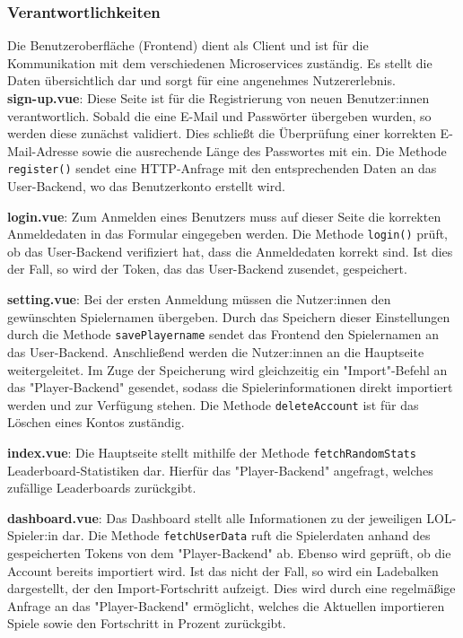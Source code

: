 \subsubsection{Verantwortlichkeiten}

Die Benutzeroberfläche (Frontend) dient als Client und ist für die Kommunikation mit dem verschiedenen Microservices zuständig. Es stellt die Daten übersichtlich dar und sorgt für eine
angenehmes Nutzererlebnis. \\

\textbf{sign-up.vue}: Diese Seite ist für die Registrierung von neuen Benutzer:innen verantwortlich. Sobald die eine E-Mail und Passwörter übergeben wurden, so werden diese zunächst
validiert. Dies schließt die Überprüfung einer korrekten E-Mail-Adresse sowie die ausrechende Länge des Passwortes mit ein. Die Methode \verb|register()| sendet eine HTTP-Anfrage mit den 
entsprechenden Daten an das User-Backend, wo das Benutzerkonto erstellt wird.
\newline

\textbf{login.vue}: Zum Anmelden eines Benutzers muss auf dieser Seite die korrekten Anmeldedaten in das Formular eingegeben werden. Die Methode \verb|login()| prüft, ob das User-Backend
verifiziert hat, dass die Anmeldedaten korrekt sind. Ist dies der Fall, so wird der Token, das das User-Backend zusendet, gespeichert. 
\newline

\textbf{setting.vue}: Bei der ersten Anmeldung müssen die Nutzer:innen den gewünschten Spielernamen übergeben. Durch das Speichern dieser Einstellungen durch die Methode \verb|savePlayername|
sendet das Frontend den Spielernamen an das User-Backend. Anschließend werden die Nutzer:innen an die Hauptseite weitergeleitet. Im Zuge der Speicherung wird gleichzeitig ein "Import"-Befehl
an das "Player-Backend" gesendet, sodass die Spielerinformationen direkt importiert werden und zur Verfügung stehen. Die Methode \verb|deleteAccount| ist für das Löschen eines Kontos zuständig.
\newline

\textbf{index.vue}: Die Hauptseite stellt mithilfe der Methode \verb|fetchRandomStats| Leaderboard-Statistiken dar. Hierfür das "Player-Backend" angefragt, welches zufällige 
Leaderboards zurückgibt.
\newline

\textbf{dashboard.vue}: Das Dashboard stellt alle Informationen zu der jeweiligen LOL-Spieler:in dar. Die Methode \verb|fetchUserData| ruft die Spielerdaten anhand des gespeicherten Tokens
von dem "Player-Backend" ab. Ebenso wird geprüft, ob die Account bereits importiert wird. Ist das nicht der Fall, so wird ein Ladebalken dargestellt, der den Import-Fortschritt aufzeigt. Dies
wird durch eine regelmäßige Anfrage an das "Player-Backend" ermöglicht, welches die Aktuellen importieren Spiele sowie den Fortschritt in Prozent zurückgibt.
\newline

